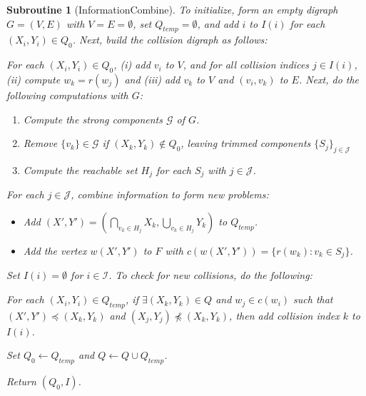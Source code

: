 \documentclass[11pt,reqno]{amsart}
\newtheorem{subroutine}[thm]{Subroutine}
\theoremstyle{definition}
\numberwithin{equation}{section}
\newcommand{\lft}{\left(}
\newcommand{\rt}{\right)}
\newcommand{\peq}{\preceq}
\newcommand{\strongc}{\mathcal{G}}
\newcommand{\strongcomp}{S}
\newcommand{\acto}{Q_0}
\newcommand{\act}{Q}
\newcommand{\actt}{Q_{temp}}
\newcommand{\coll}{I}
\newcommand{\reach}{H}
\newcommand{\forest}{F}
\newcommand{\pairi}{(X_i,Y_i)}
\newcommand{\pairp}{(X',Y')}
\begin{document}
\begin{subroutine}[InformationCombine] \label{sub:infcomb2}
To initialize, form an empty digraph $G = (V,E)$ with $V = E = \emptyset$, set $\actt = \emptyset$, and add $i$ to $\coll(i)$ for each $\pairi \in \acto$.
Next, build the collision digraph as follows: 

For each $\pairi \in \acto$, (i) add $v_i$ to $V$, and for all collision indices $j \in \coll(i)$, (ii) compute $w_k = r(w_j)$ and (iii) add  $v_k$ to $V$ and $(v_i,v_k)$ to $E$. 
Next, do the following computations with $G$:
\begin{enumerate}
\item Compute the strong components $\strongc$ of $G$.
\item Remove $\{v_k \} \in \strongc$ if $(X_k,Y_k) \not \in \acto$, leaving trimmed components $\{S_j\}_{j \in \mathcal{J}}$
\item Compute the reachable set $\reach_j$ for each $\strongcomp_j$ with $j \in \mathcal{J}$.
\end{enumerate}

For each $j \in \mathcal{J}$, combine information to form new problems:

\begin{itemize}
\item[(a)] Add $\pairp = \lft \bigcap\limits_{v_k \in \reach_j} X_k, \bigcup\limits_{v_k \in \reach_j} Y_k \rt$ to $\actt$. 
\item[(b)] Add the vertex $w\pairp$ to $\forest$ with $c(w\pairp) = \{r(w_k): v_k \in \strongcomp_j\}$.
\end{itemize}

Set $\coll(i) = \emptyset$ for $i \in \mathcal{I}$. 
To check for new collisions, do the following:

For each $\pairi \in \actt$, if $\exists (X_k, Y_k) \in \act$ and $w_j \in c(w_i)$ such that $\pairp \peq (X_k, Y_k)$ and $(X_j, Y_j) \not \peq (X_k, Y_k)$, then add collision index $k$ to $\coll(i)$.

Set $\acto \leftarrow \actt$ and $\act \leftarrow \act \cup \actt$.

Return $(\acto, \coll)$.
\end{subroutine}
\end{document}

